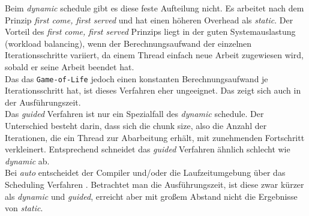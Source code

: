 \documentclass[german,plainarticle,hyperref,utf8]{zihpub}
\begin{document}
	Beim \textit{dynamic} schedule gibt es diese feste Aufteilung nicht. Es arbeitet nach dem Prinzip \textit{first come, first served} und hat einen höheren Overhead als \textit{static}. Der Vorteil des \textit{first come, first served} Prinzips liegt in der guten Systemauslastung (workload balancing), wenn der Berechnungsaufwand der einzelnen Iterationsschritte variiert, da einem Thread einfach neue Arbeit zugewiesen wird, sobald er seine Arbeit beendet hat.\\
	Das das \texttt{Game-of-Life} jedoch einen konstanten Berechnungsaufwand je Iterationsschritt hat, ist dieses Verfahren eher ungeeignet. Das zeigt sich auch in der Ausführungszeit.\\
	
	Das \textit{guided} Verfahren ist nur ein Spezialfall des \textit{dynamic} schedule. Der Unterschied besteht darin, dass sich die chunk size, also die Anzahl der Iterationen, die ein Thread zur Abarbeitung erhält, mit zunehmenden Fortschritt verkleinert. Entsprechend schneidet das \textit{guided} Verfahren ähnlich schlecht wie \textit{dynamic} ab.\\
	
	Bei \textit{auto} entscheidet der Compiler und/oder die Laufzeitumgebung über das Scheduling Verfahren \cite{schedule}. Betrachtet man die Ausführungszeit, ist diese zwar kürzer als \textit{dynamic} und \textit{guided}, erreicht aber mit großem Abstand nicht die Ergebnisse von \textit{static}.
	\appendix
\end{document}
